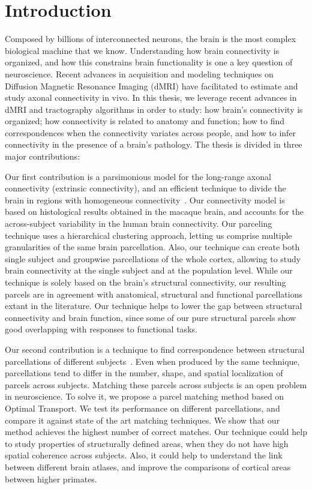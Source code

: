 \chapter{Introduction}

Composed by billions of interconnected neurons, the brain is the most complex
biological machine that we know. Understanding how brain connectivity is 
organized, and how this constrains brain functionality is one a key question
of neuroscience. Recent advances in acquisition and modeling techniques on
Diffusion Magnetic Resonance Imaging (dMRI) have facilitated to estimate and
study axonal connectivity in vivo. In this thesis, we leverage recent advances
in dMRI and tractography algorithms in order to study: how brain's connectivity
is organized; how connectivity is related to anatomy and function; how to
find correspondences when the connectivity variates across people, and how to
infer connectivity in the presence of a brain's pathology. The thesis is
divided in three major contributions:

Our first contribution is a parsimonious model for the long-range axonal
connectivity (extrinsic connectivity), and an efficient technique to divide the
brain in regions with homogeneous connectivity~\cite{Gallardo2017a}. Our
connectivity model is based on histological results obtained in the macaque
brain, and accounts for the across-subject variability in the human brain
connectivity. Our parceling technique uses a hierarchical clustering approach,
letting us comprise multiple granularities of the same brain parcellation.
Also, our technique can create both single subject and groupwise parcellations
of the whole cortex, allowing to study brain connectivity at the single subject
and at the population level. While our technique is solely based on the brain's
structural connectivity, our resulting parcels are in agreement with anatomical,
structural and functional parcellations extant in the literature. Our technique
helps to lower the gap between structural connectivity and brain function, since
some of our pure structural parcels show good overlapping with responses to
functional tasks.

Our second contribution is a technique to find correspondence between
structural parcellations of different subjects~\cite{Gallardo2018}. Even when
produced by the same technique, parcellations tend to differ in the
number, shape, and spatial localization of parcels across subjects. Matching
these parcels across subjects is an open problem in neuroscience. To solve
it, we propose a parcel matching method based on Optimal Transport. We test its
performance on different parcellations, and compare it against state of the
art matching techniques. We show that our method achieves the highest number
of correct matches. Our technique could help to study properties of structurally
defined areas, when they do not have high spatial coherence across subjects.
Also, it could help to understand the link between different brain atlases, and
improve the comparisons of cortical areas between higher primates.

